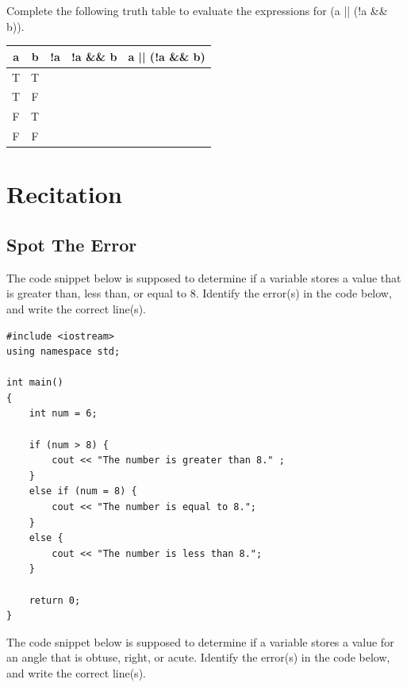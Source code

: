 \begin{problem}
    Complete the following truth table to evaluate the expressions for (a || (!a \&\& b)).
\end{problem}

\begin{table}[H]
    \centering
    \begin{tabular}{c|c|c|c|c}
         a & b & !a & !a \&\& b & a || (!a \&\& b)\\ \hline
         T & T &  &  &  \\
         T & F &  &  &  \\
         F & T &  &  &  \\
         F & F &  &  &  \\
    \end{tabular}
\end{table}

\section{Recitation}

\subsection{Spot The Error}

\begin{multipart}
The code snippet below is supposed to determine if a variable stores a value that is greater than, less than, or equal to 8. Identify the error(s) in the code below, and write the correct line(s).
\end{multipart}

\begin{verbatim}
#include <iostream>
using namespace std;

int main()
{
    int num = 6;

    if (num > 8) {
        cout << "The number is greater than 8." ;
    }
    else if (num = 8) {
        cout << "The number is equal to 8."; 
    }
    else {
        cout << "The number is less than 8.";
    }

    return 0; 
}
\end{verbatim}

\begin{multipart}
The code snippet below is supposed to determine if a variable stores a value for an angle that is obtuse, right, or acute. Identify the error(s) in the code below, and write the correct line(s).
\end{multipart}

